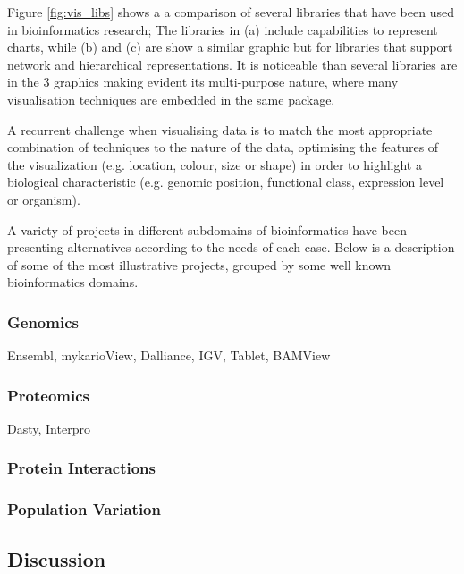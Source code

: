 Figure \ref{fig:vis_libs} shows a a comparison of several libraries that have been used in bioinformatics research; The libraries in (a) include capabilities to represent charts, while (b) and (c) are show a similar graphic but for libraries that support network and hierarchical representations. It is noticeable than several libraries are in the 3 graphics making evident its multi-purpose nature, where many visualisation techniques are embedded in the same package.

A recurrent challenge when visualising data is to match the most appropriate combination of techniques to the nature of the data, optimising the features of the visualization (e.g. location, colour, size or shape) in order to highlight a biological characteristic (e.g. genomic position, functional class, expression level or organism).

A variety of projects in different subdomains of bioinformatics have been presenting alternatives according to the needs of each case. Below is a description of some of the most illustrative projects, grouped by some well known bioinformatics domains.

\subsubsection{Genomics}
Ensembl, mykarioView, Dalliance, IGV, Tablet, BAMView
\subsubsection{Proteomics}
Dasty, Interpro
\subsubsection{Protein Interactions}
\subsubsection{Population Variation}

\subsection{Discussion}


